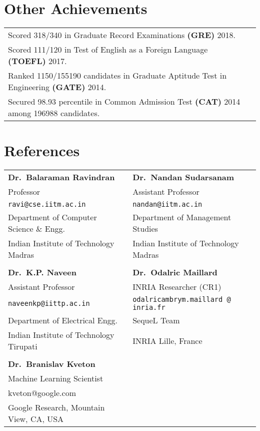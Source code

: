 \documentclass[margin,11pt]{res}
\begin{document}
\begin{resume}
\section{Other Achievements}
\begin{tabular}{p{12cm}p{80cm}}
Scored 318/340 in Graduate Record Examinations \textbf{(GRE)} 2018.\\
Scored 111/120 in Test of English as a Foreign Language \textbf{(TOEFL)} 2017.\\
Ranked 1150/155190 candidates in Graduate Aptitude Test in Engineering \textbf{(GATE)} 2014. \\
Secured 98.93 percentile in Common Admission Test \textbf{(CAT)} 2014 among 196988 candidates.
\end{tabular}

\section{References}
\begin{tabular}{lll}
\textbf{Dr.~Balaraman Ravindran} & \textbf{Dr.~Nandan Sudarsanam} \\
Professor & Assistant Professor\\
\texttt{ravi@cse.iitm.ac.in} & \texttt{nandan@iitm.ac.in}\\
Department of Computer Science \& Engg. & Department of Management Studies\\ 
Indian Institute of Technology Madras & Indian Institute of Technology Madras\\
\\
\textbf{Dr.~K.P. Naveen}  & \textbf{Dr.~Odalric Maillard} \\
Assistant Professor & INRIA Researcher (CR1) \\
\texttt{naveenkp@iittp.ac.in} & \texttt{odalricambrym.maillard @ inria.fr}\\
Department of Electrical Engg. & SequeL Team \\ 
Indian Institute of Technology Tirupati & INRIA Lille, France\\
\\
\textbf{Dr.~Branislav Kveton}\\
Machine Learning Scientist\\
kveton@google.com\\
Google Research, Mountain View, CA, USA
\end{tabular}



\end{resume}
\end{document}
